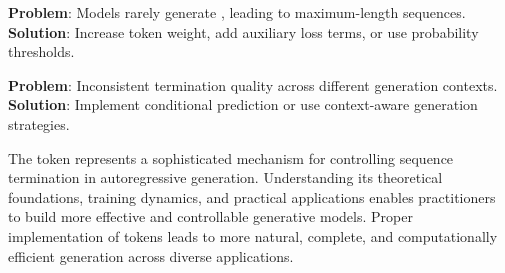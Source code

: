 \textbf{Problem}: Models rarely generate \eos{}, leading to maximum-length sequences.
\textbf{Solution}: Increase \eos{} token weight, add auxiliary loss terms, or use \eos{} probability thresholds.

\textbf{Problem}: Inconsistent termination quality across different generation contexts.
\textbf{Solution}: Implement conditional \eos{} prediction or use context-aware generation strategies.

The \eos{} token represents a sophisticated mechanism for controlling sequence termination in autoregressive generation. Understanding its theoretical foundations, training dynamics, and practical applications enables practitioners to build more effective and controllable generative models. Proper implementation of \eos{} tokens leads to more natural, complete, and computationally efficient generation across diverse applications.